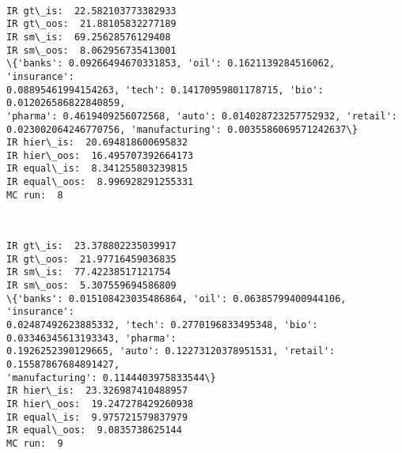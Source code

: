 \documentclass[11pt]{article}
\begin{document}
    \begin{center}
    \end{center}
    { \hspace*{\fill} \\}
    
    \begin{Verbatim}[commandchars=\\\{\},fontsize=\footnotesize]
IR gt\_is:  22.582103773382933
IR gt\_oos:  21.88105832277189
IR sm\_is:  69.25628576129408
IR sm\_oos:  8.062956735413001
\{'banks': 0.09266494670331853, 'oil': 0.1621139284516062, 'insurance':
0.08895461994154263, 'tech': 0.14170959801178715, 'bio': 0.012026586822840859,
'pharma': 0.4619409256072568, 'auto': 0.014028723257752932, 'retail':
0.023002064246770756, 'manufacturing': 0.0035586069571242637\}
IR hier\_is:  20.694818600695832
IR hier\_oos:  16.495707392664173
IR equal\_is:  8.341255803239815
IR equal\_oos:  8.996928291255331
MC run:  8

    \end{Verbatim}

    \begin{center}
    \end{center}
    { \hspace*{\fill} \\}
    
    \begin{Verbatim}[commandchars=\\\{\},fontsize=\footnotesize]
IR gt\_is:  23.378802235039917
IR gt\_oos:  21.97716459036835
IR sm\_is:  77.42238517121754
IR sm\_oos:  5.307559694586809
\{'banks': 0.015108423035486864, 'oil': 0.06385799400944106, 'insurance':
0.02487492623885332, 'tech': 0.2770196833495348, 'bio': 0.03346345613193343, 'pharma':
0.1926252390129665, 'auto': 0.12273120378951531, 'retail': 0.15587867684891427,
'manufacturing': 0.1144403975833544\}
IR hier\_is:  23.326987410488957
IR hier\_oos:  19.247278429260938
IR equal\_is:  9.975721579837979
IR equal\_oos:  9.0835738625144
MC run:  9

    \end{Verbatim}

    \begin{center}
    \end{center}
    { \hspace*{\fill} \\}
    
\end{document}
